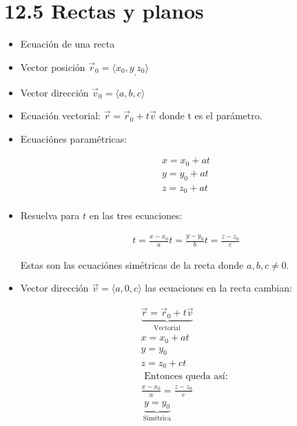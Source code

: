 \section{12.5 Rectas y planos}
\begin{itemize}
    \item Ecuación de una recta 
    \item Vector posición $\vec{r}_0  = \langle x_0,y_,z_0 \rangle $
    \item Vector dirección $\vec{v}_0 = \langle a,b,c \rangle$
    \item Ecuación vectorial: $\vec{r} = \vec{r}_0 + t\vec{v}$ donde t es el parámetro.
    \item Ecuaciónes paramétricas: \begin{center}
        \begin{align*}
            x = x_0 +at \\ 
            y = y_0+ at \\ 
            z = z_0+at \\ 
        \end{align*}
    \end{center}
    
    \item Resuelva para $t$ en las tres ecuaciones:  
        \begin{center}
            \begin{align*}
                t = \frac{x-x_0}{a} 
                t = \frac{y-y_0}{b} 
                t = \frac{z-z_0}{c} 
            \end{align*}
        \end{center}
        Estas son las ecuaciónes simétricas de la recta donde $a,b,c \neq 0$.
        
        \item Vector dirección $\vec{v}= \langle a,0,c \rangle $ las ecuaciones en la recta cambian:
            \begin{center}
                \begin{align*}
                    \underbrace{\vec{r} = \vec{r}_0 + t \vec{v}}_{\text{  Vectorial  }} \\ 
                    x = x_0+at \\ 
                    y = y_0 \\ 
                    z = z_0 +ct \\ 
                    \text{  Entonces queda así:  } \\ 
                    \frac{x-x_0}{a} = \frac{z-z_0}{c} \\ 
                    \underbrace{y = y_0}_{\text{  Simétrica  }} \\   
                \end{align*}
            \end{center}
\end{itemize}

